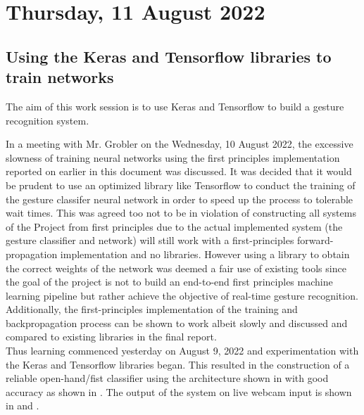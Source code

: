\section[2022/08/11]{Thursday, 11 August 2022}

\subsection{Using the Keras and Tensorflow libraries to train networks}

The aim of this work session is to use Keras and Tensorflow to build a gesture recognition system.

In a meeting with Mr. Grobler on the Wednesday, 10 August 2022, the excessive slowness of training neural networks using the first principles implementation reported on earlier in this document was discussed. It was decided that it would be prudent to use an optimized library like Tensorflow to conduct the training of the gesture classifer neural network in order to speed up the process to tolerable wait times. This was agreed too not to be in violation of constructing all systems of the Project from first principles due to the actual implemented system (the gesture classifier and network) will still work with a first-principles forward-propagation implementation and no libraries. However using a library to obtain the correct weights of the network was deemed a fair use of existing tools since the goal of the project is not to build an end-to-end first principles machine learning pipeline but rather achieve the objective of real-time gesture recognition. Additionally, the first-principles implementation of the training and backpropagation process can be shown to work albeit slowly and discussed and compared to existing libraries in the final report. \\

Thus learning commenced yesterday on August 9, 2022 and experimentation with the Keras and Tensorflow libraries began. This resulted in the construction of a reliable open-hand/fist classifier using the architecture shown in  with good accuracy as shown in  . The output of the system on live webcam input is shown in  and .

